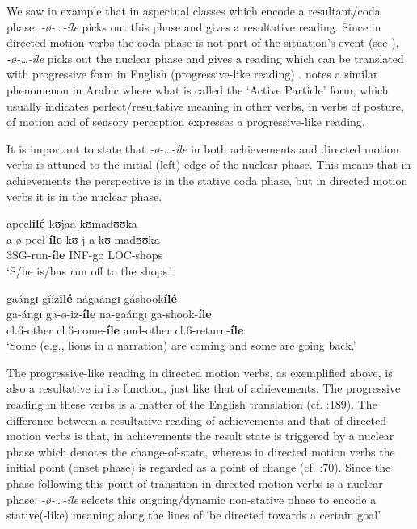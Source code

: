 \documentclass[output=paper,newtxmath,modfonts,nonflat,draftmode]{langsci/langscibook}
\begin{document}
We saw in example  that in aspectual classes which encode a resultant/coda phase, \textit{-ø}\textit{-…-íle} picks out this phase and gives a resultative reading. Since in directed motion verbs the coda phase is not part of the situation’s event (see ), \textit{-ø}\textit{-…-íle} picks out the nuclear phase and gives a reading which can be translated with progressive form in English (progressive-like reading) . \citet[194]{Ebert1995} notes a similar phenomenon in Arabic where what is called the ‘Active Particle’ form, which usually indicates perfect/resultative meaning in other verbs, in verbs of posture, of motion and of sensory perception expresses a progressive-like reading.

It is important to state that \textit{-ø}\textit{-…-íle} in both achievements and directed motion verbs is attuned to the initial (left) edge of the nuclear phase. This means that in achievements the perspective is in the stative coda phase, but in directed motion verbs it is in the nuclear phase.

\ea \label{ex:kanijo:21}
\ea
\glll apeel\textbf{ilé}  kʊjaa kʊmadʊʊka\\
 a-ø-peel-\textbf{íle} kʊ-j-a kʊ-madʊʊka\\
   3SG-run-\textbf{íle} INF-go LOC-shops\\
 \glt ‘S/he is/has run off to the shops.’

\ex 
  gaángɪ     gííz\textbf{ilé}  nágaángɪ  gáshook\textbf{ílé}\\
 ga-ángɪ     ga-ø-iz-\textbf{íle}      na-gaángɪ  ga-shook-\textbf{íle}\\
 cl.6-other  cl.6-come-\textbf{íle} and-other   cl.6-return-\textbf{íle}\\
\glt ‘Some (e.g., lions in a narration) are coming and some are going back.’
\z
\z

The progressive-like reading in directed motion verbs, as exemplified above, is also a resultative in its function, just like that of achievements. The progressive reading in these verbs is a matter of the English translation (cf. \citealt{Ebert1995}:189). The difference between a resultative reading of achievements and that of directed motion verbs is that, in achievements the result state is triggered by a nuclear phase which denotes the change-of-state, whereas in directed motion verbs the initial point (onset phase) is regarded as a point of change (cf. \citealt{Smith1991}:70). Since the phase following this point of transition in directed motion verbs is a nuclear phase, \textit{-ø}\textit{-…-íle} selects this ongoing/dynamic non-stative phase to encode a stative(-like) meaning along the lines of ‘be directed towards a certain goal’. 
\end{document}
